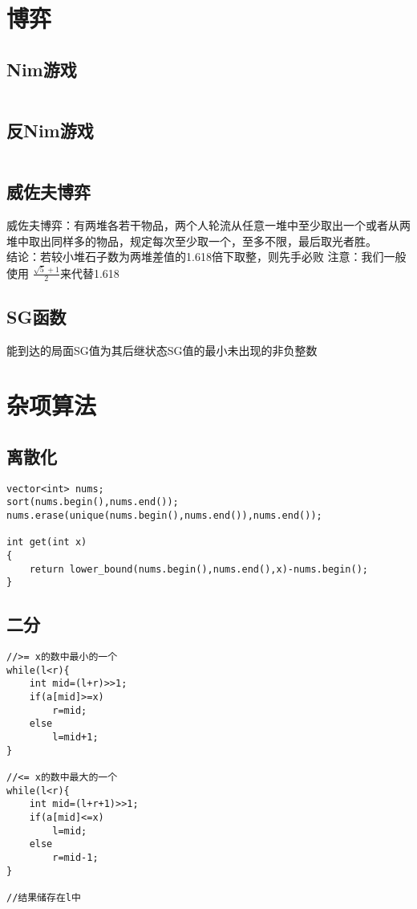 \documentclass[twocolumn,a4]{article}
\begin{document}
\section{博弈}

\subsection{Nim游戏}
\begin{lstlisting}

\end{lstlisting}

\subsection{反Nim游戏}
\begin{lstlisting}

\end{lstlisting}

\subsection{威佐夫博弈}
威佐夫博弈：有两堆各若干物品，两个人轮流从任意一堆中至少取出一个或者从两堆中取出同样多的物品，规定每次至少取一个，至多不限，最后取光者胜。\\
结论：若较小堆石子数为两堆差值的1.618倍下取整，则先手必败
注意：我们一般使用 $\frac{\sqrt{5}+1}{2}$来代替1.618

\subsection{SG函数}
能到达的局面SG值为其后继状态SG值的最小未出现的非负整数

\section{杂项算法}

\subsection{离散化}
\begin{lstlisting}
vector<int> nums;
sort(nums.begin(),nums.end());
nums.erase(unique(nums.begin(),nums.end()),nums.end());

int get(int x)
{
    return lower_bound(nums.begin(),nums.end(),x)-nums.begin();
}
\end{lstlisting}
\subsection{二分}
\begin{lstlisting}
//>= x的数中最小的一个
while(l<r){
    int mid=(l+r)>>1;
    if(a[mid]>=x)
        r=mid;
    else
        l=mid+1;
}

//<= x的数中最大的一个
while(l<r){
    int mid=(l+r+1)>>1;
    if(a[mid]<=x)
        l=mid;
    else
        r=mid-1;
}

//结果储存在l中
\end{lstlisting}
\end{document}
